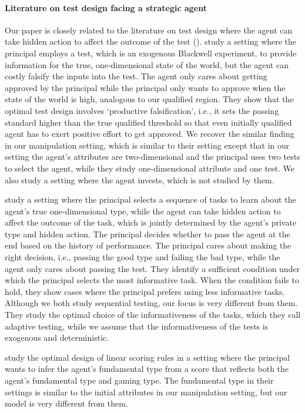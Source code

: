 \paragraph{Literature on test design facing a strategic agent}
Our paper is closely related to the literature on test design where the agent can take hidden action to affect the outcome of the test (\citet{perez2022test, deb2018optimal}).
\citet{perez2022test} study  a setting where the principal employs a test, which is an exogenous Blackwell experiment, to provide information for the true, one-dimensional state of the world, but the agent can costly falsify the inputs into the test.
The agent only cares about getting approved by the principal while the principal only wants to approve when the state of the world is high, analogous to our qualified region.
They show that the optimal test design involves `productive falsification', i.e., it sets the passing standard higher than the true qualified threshold so that even initially qualified agent has to exert positive effort to get approved.
We recover the similar finding in our manipulation setting, which is similar to their setting except that in our setting the agent's attributes are two-dimensional and the principal uses two tests to select the agent, while they study one-dimensional attribute and one test.
We also study a setting where the agent invests, which is not studied by them.

\citet{deb2018optimal} study a setting where the principal selects a sequence of tasks to learn about the agent's true one-dimensional type, while the agent can take hidden action to affect the outcome of the task, which is jointly determined by the agent's private type and hidden action.
The principal decides whether to pass the agent at the end based on the history of performance.
The principal cares about making the right decision, i.e., passing the good type and failing the bad type, while the agent only cares about passing the test.
They identify a sufficient condition under which the principal selects the most informative task. When the condition fails to hold, they show cases where the principal prefers using less informative tasks.
Although we both study sequential testing, our focus is very different from them. 
They study the optimal choice of the informativeness of the tasks, which they call adaptive testing, while we assume that the informativeness of the tests is exogenous and deterministic.

\citet{frankel2022improving,ballscoring} study the optimal design of linear scoring rules in a setting where the principal wants to infer the agent's fundamental type from a score that reflects both the agent's fundamental type and gaming type.
The fundamental type in their settings is similar to the initial attributes in our manipulation setting, but our model is very different from them.

